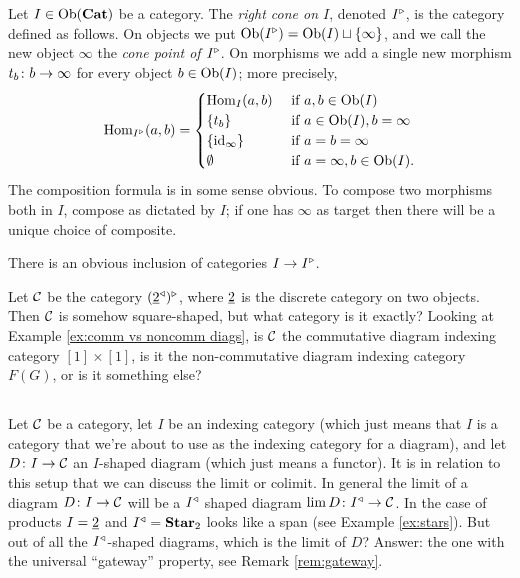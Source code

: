 \begin{definition}\label{def:rcone}

Let $I\in\textnormal{Ob}({\bf Cat})$ be a category. The {\em right cone on $I$}, denoted $I^\triangleright$, is the category defined as follows. On objects we put $\textnormal{Ob}(I^\triangleright)=\textnormal{Ob}(I)\sqcup\{\infty\}$, and we call the new object $\infty$ the {\em cone point of $I^\triangleright$}. On morphisms we add a single new morphism $t_b\colon b\rightarrow\infty$ for every object $b\in \textnormal{Ob}(I)$; more precisely,
$$\textnormal{Hom}_{I^\triangleright}(a,b)=
\begin{cases}
\textnormal{Hom}_I(a,b)&\textnormal{ if }a,b\in\textnormal{Ob}(I)\\
\{t_b\}&\textnormal{ if }a\in\textnormal{Ob}(I), b=\infty\\
\{\textnormal{id}_{\infty}\}&\textnormal{ if } a=b=\infty\\
\emptyset&\textnormal{ if } a=\infty,b\in\textnormal{Ob}(I).
\end{cases}$$
The composition formula is in some sense obvious. To compose two morphisms both in $I$, compose as dictated by $I$; if one has $\infty$ as target then there will be a unique choice of composite.

There is an obvious inclusion of categories $I\rightarrow I^\triangleright$.

\end{definition}

\begin{exercise}
Let $\mathcal{C}$ be the category $(\underline{2}^\triangleleft)^\triangleright$, where $\underline{2}$ is the discrete category on two objects. Then $\mathcal{C}$ is somehow square-shaped, but what category is it exactly? Looking at Example \ref{ex:comm vs noncomm diags}, is $\mathcal{C}$ the commutative diagram indexing category $[1]\times[1]$, is it the non-commutative diagram indexing category $F(G)$, or is it something else?
\end{exercise}


\subsection{}\label{sec:lims and colims in a cat}

Let $\mathcal{C}$ be a category, let $I$ be an indexing category (which just means that $I$ is a category that we're about to use as the indexing category for a diagram), and let $D\colon I\rightarrow\mathcal{C}$ an $I$-shaped diagram (which just means a functor). It is in relation to this setup that we can discuss the limit or colimit. In general the limit of a diagram $D\colon I\rightarrow\mathcal{C}$ will be a $I^\triangleleft$ shaped diagram $\lim D\colon I^\triangleleft\rightarrow\mathcal{C}$. In the case of products $I=\underline{2}$ and $I^\triangleleft={\bf Star}_2$ looks like a span (see Example \ref{ex:stars}). But out of all the $I^\triangleleft$-shaped diagrams, which is the limit of $D$? Answer: the one with the universal “gateway” property, see Remark \ref{rem:gateway}.

